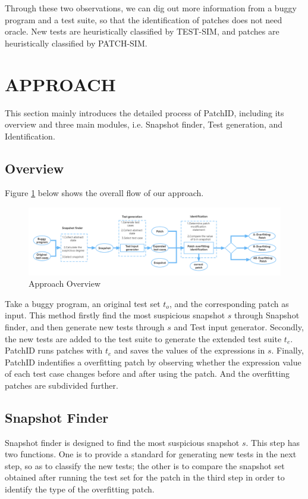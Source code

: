 \documentclass[sn-basic]{sn-jnl}
\theoremstyle{thmstyleone}
\theoremstyle{thmstyletwo}
\theoremstyle{thmstylethree}
\begin{document}
Through these two observations, we can dig out more information from a buggy program and a test suite, so that the identification of patches does not need oracle. New tests are heuristically classified by TEST-SIM, and patches are heuristically classified by PATCH-SIM.

\section{APPROACH}\label{sec4}
This section mainly introduces the detailed process of PatchID, including its overview and three main modules, i.e. Snapshot finder, Test generation, and Identification.

\subsection{Overview}
Figure \ref{fig5} below shows the overall flow of our approach.

\begin{figure}[ht]%
	\centering
	\includegraphics[width=1\textwidth]{fig5.png}
	\caption{Approach Overview}\label{fig5}
\end{figure}

Take a buggy program, an original test set $t_o$, and the corresponding patch as input. This method firstly find the most suspicious snapshot $s$ through Snapshot finder, and then generate new tests through $s$ and Test input generator. Secondly, the new tests are added to the test suite to generate the extended test suite $t_e$. PatchID runs patches with $t_e$ and saves the values of the expressions in $s$. Finally, PatchID indentifies a overfitting patch by observing whether the expression value of each test case changes before and after using the patch. And the overfitting patches are subdivided further.

\subsection{Snapshot Finder}
Snapshot finder is designed to find the most suspicious snapshot $s$. This step has two functions. One is to provide a standard for generating new tests in the next step, so as to classify the new tests; the other is to compare the snapshot set obtained after running the test set for the patch in the third step in order to identify the type of the overfitting patch.
\end{document}
